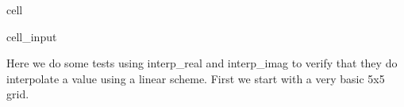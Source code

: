 \documentclass[letterpaper,10pt,english]{jupyterBook}
\begin{document}
\begin{sphinxuseclass}{cell}
\begin{sphinxVerbatimInput}
\begin{sphinxuseclass}{cell_input}
\begin{sphinxVerbatim}[commandchars=\\\{\}]
      
      

         
\end{sphinxVerbatim}

\end{sphinxuseclass}\end{sphinxVerbatimInput}

\end{sphinxuseclass}
\sphinxAtStartPar
Here we do some tests using interp\_real and interp\_imag to verify that they do interpolate a value using a linear scheme. First we start with a very basic 5x5 grid.
\end{document}
